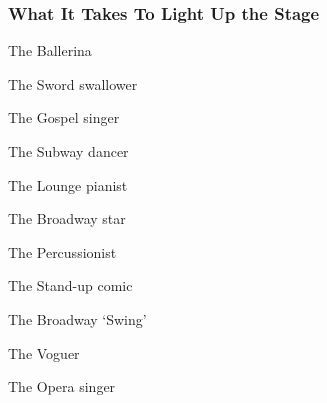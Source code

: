 \hypertarget{what-it-takes-to-light-up-the-stage}{%
\subsubsection{What It Takes To Light Up the
Stage}\label{what-it-takes-to-light-up-the-stage}}

\href{https://www.nytimes3xbfgragh.onion/interactive/2019/05/30/magazine/dance-ballet-new-york.html}{}

The Ballerina

\href{https://www.nytimes3xbfgragh.onion/interactive/2019/05/30/magazine/sword-swallowing-new-york.html}{}

The Sword swallower

\href{https://www.nytimes3xbfgragh.onion/interactive/2019/05/30/magazine/gospel-singer-new-york.html}{}

The Gospel singer

\href{https://www.nytimes3xbfgragh.onion/interactive/2019/05/30/magazine/subway-dance-new-york.html}{}

The Subway dancer

\href{https://www.nytimes3xbfgragh.onion/interactive/2019/05/30/magazine/earl-rose-piano-carlyle-new-york.html}{}

The Lounge pianist

\href{https://www.nytimes3xbfgragh.onion/interactive/2019/05/30/magazine/broadway-kiss-me-kate.html}{}

The Broadway star

\href{https://www.nytimes3xbfgragh.onion/interactive/2019/05/30/magazine/latin-beat-new-york.html}{}

The Percussionist

\href{https://www.nytimes3xbfgragh.onion/interactive/2019/05/30/magazine/female-comedy-new-york.html}{}

The Stand-up comic

\href{https://www.nytimes3xbfgragh.onion/interactive/2019/05/30/magazine/aladdin-musical-new-york.html}{}

The Broadway `Swing'

\href{https://www.nytimes3xbfgragh.onion/interactive/2019/05/30/magazine/vogue-kiki-new-york.html}{}

The Voguer

\href{https://www.nytimes3xbfgragh.onion/interactive/2019/05/30/magazine/metropolitan-opera-singer-new-york.html}{}

The Opera singer

